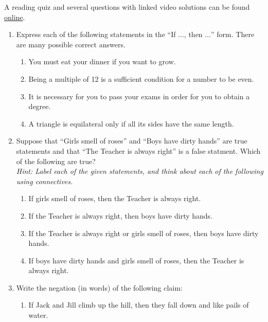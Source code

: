 \begin{exercises}{}{}
A reading quiz and several questions with linked video solutions can be found \href{http://www.math.uci.edu/~ndonalds/math13/quizzes/2-1-props.html}{online}.

\bigskip

\begin{enumerate}%
  \item Express each of the following statements in the ``If $\dots$, then $\dots$'' form. There are many possible correct answers.
		\begin{enumerate}
	  	\item You must eat your dinner if you want to grow.
	  	\item Being a multiple of 12 is a sufficient condition for a number to be even.
	  	\item It is necessary for you to pass your exams in order for you to obtain a degree. 
	  	\item A triangle is equilateral only if all its sides have the same length.
		\end{enumerate}
	
  \item Suppose that ``Girls smell of roses'' and ``Boys have dirty hands'' are true statements and that ``The Teacher is always right'' is a false statment. Which of the following are true?\\
  \emph{Hint: Label each of the given statements, and think about each of the following using connectives.}
		\begin{enumerate}
	  	\item If girls smell of roses, then the Teacher is always right.
	  	\item If the Teacher is always right, then boys have dirty hands.
	  	\item If the Teacher is always right or girls smell of roses, then boys have dirty hands.
	  	\item If boys have dirty hands and girls smell of roses, then the Teacher is always right.
		\end{enumerate}
	
  \item Write the negation (in words) of the following claim:
		\begin{enumerate}\setlength{\itemsep}{0pt}
		  \item[] If Jack and Jill climb up the hill, then they fall down and like pails of water. 
		\end{enumerate}


\end{enumerate}
\end{exercises}
